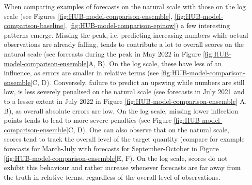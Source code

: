 \documentclass{article}
\begin{document}
When comparing examples of forecasts on the natural scale with those on the log scale (see Figures \ref{fig:HUB-model-comparison-ensemble}, \ref{fig:HUB-model-comparison-baseline}, \ref{fig:HUB-model-comparison-epinow}) a few interesting patterns emerge. Missing the peak, i.e. predicting increasing numbers while actual observations are already falling, tends to contribute a lot to overall scores on the natural scale (see forecasts during the peak in May 2022 in Figure \ref{fig:HUB-model-comparison-ensemble}A, B). On the log scale, these have less of an influence, as errors are smaller in relative terms (see \ref{fig:HUB-model-comparison-ensemble}C, D). Conversely, failure to predict an upswing while numbers are still low, is less severely penalised on the natural scale (see forecasts in July 2021 and to a lesser extent in July 2022 in Figure \ref{fig:HUB-model-comparison-ensemble} A, B), as overall absolute errors are low. On the log scale, missing lower inflection points tends to lead to more severe penalties (see Figure \ref{fig:HUB-model-comparison-ensemble}C, D). One can also observe that on the natural scale, scores tend to track the overall level of the target quantity (compare for example forecasts for March-July with forecasts for September-October in Figure \ref{fig:HUB-model-comparison-ensemble}E, F). On the log scale, scores do not exhibit this behaviour and rather increase whenever forecasts are far away from the truth in relative terms, regardless of the overall level of observations. 
\end{document}
